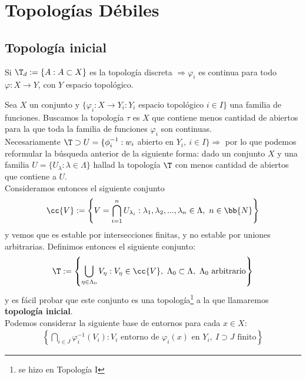 \chapter{Topologías Débiles}

\section{Topología inicial}

\begin{observacion}
    Si $\T_d:=\{A: A\subset X\}$ es la topología discreta $\Rightarrow \varphi_i$ es continua para todo $\varphi:X\to Y$, con $Y$ espacio topológico. 
\end{observacion}

\begin{definicion}
    Sea $X$ un conjunto y $\{\varphi_i: X\to Y_i: Y_i$ espacio topológico $i\in I\}$ una familia de funciones. Buscamos la topología $\tau$ es $X$ que contiene menos cantidad de abiertos para la que toda la familia de funciones $\varphi_i$ son continuas.\\

    Necesariamente $\T\supset U = \{\phi_i^{-1}:w_i$ abierto en $Y_i,\ i\in I\}\Rightarrow$ por lo que podemos reformular la búsqueda anterior de la siguiente forma: dado un conjunto $X$ y una familia $U=\{U_\lambda : \lambda \in \Lambda\}$ hallad la topología $\T$ con menos cantidad de abiertos que contiene a $U$.\\

    Consideramos entonces el siguiente conjunto
    \begin{gather*}
        \cc{V} := \left\{ V = \bigcap\limits_{i=1}^n U_{\lambda_i}:\lambda_1, \lambda_2,...,\lambda_n \in \Lambda,\ n \in \bb{N} \right\}
    \end{gather*}
    y vemos que es estable por intersecciones finitas, y no estable por uniones arbitrarias. Definimos entonces el siguiente conjunto:
    \begin{gather*}
        \T :=\left\{ \bigcup_{\eta\in \Lambda_0} V_\eta : V_\eta \in \cc{V},\ \Lambda_0\subset \Lambda,\ \Lambda_0 \text{ arbitrario} \right\}
    \end{gather*}
    y es fácil probar que este conjunto es una topología\footnote{se hizo en Topología I} a la que llamaremos \textbf{topología inicial}.\\

    Podemos considerar la siguiente base de entornos para cada $x\in X$:
    \begin{gather*}
        \left\{\bigcap_{i\in J} \varphi_i^{-1} (V_i): V_i \text{ entorno de } \varphi_i(x) \text{ en } Y_i,\ I\supset J \text{ finito}\right\}
    \end{gather*}
\end{definicion}

